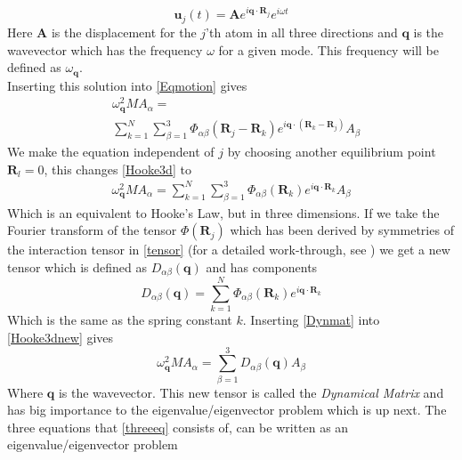 \begin{equation}
    \mathbf{u}_{j}(t)=\mathbf{A}e^{i\mathbf{q}\cdot\mathbf{R}_{j}}e^{i\omega t}
\end{equation}
Here $\mathbf{A}$ is the displacement for the $j$'th atom in all three directions and $\mathbf{q}$ is the wavevector which has the frequency $\omega$ for a given mode. This frequency will be defined as $\omega_{\mathbf{q}}$.\\ Inserting this solution into \cref{Eqmotion} gives
\begin{align}
&\omega_{\mathbf{q}}^{2}MA_{\alpha}=\nonumber\\
&\sum_{k=1}^{N}\sum_{\beta=1}^{3}\Phi_{\alpha\beta}(\mathbf{R}_{j}-\mathbf{R}_{k})e^{i\mathbf{q}\cdot(\mathbf{R}_{k}-\mathbf{R}_{j})}A_{\beta}\label{Hooke3d}
\end{align}
We make the equation independent of $j$ by choosing another equilibrium point $\mathbf{R}_{l}=0$, this changes \cref{Hooke3d} to
\begin{align}
\omega_{\mathbf{q}}^{2}MA_{\alpha}=\sum_{k=1}^{N}\sum_{\beta=1}^{3}\Phi_{\alpha\beta}(\mathbf{R}_{k})e^{i\mathbf{q}\cdot\mathbf{R}_{k}}A_{\beta}\label{Hooke3dnew}
\end{align}
Which is an equivalent to Hooke's Law, but in three dimensions. If we take the Fourier transform of the tensor $\Phi(\mathbf{R}_{j})$ which has been derived by symmetries of the interaction tensor in \cref{tensor} (for a detailed work-through, see ) we get a new tensor which is defined as $D_{\alpha\beta}(\mathbf{q})$ and has components
\begin{equation}
    D_{\alpha\beta}(\mathbf{q})=\sum_{k=1}^{N}\Phi_{\alpha\beta}(\mathbf{R}_{k})e^{i\mathbf{q}\cdot\mathbf{R}_{k}}\label{Dynmat}
\end{equation}
Which is the same as the spring constant $k$. Inserting \cref{Dynmat} into \cref{Hooke3dnew} gives
\begin{equation}
    \omega_{\mathbf{q}}^{2}MA_{\alpha}=\sum_{\beta=1}^{3}D_{\alpha\beta}(\mathbf{q})A_{\beta}\label{threeeq}
\end{equation}
Where $\mathbf{q}$ is the wavevector. This new tensor is called the \textit{Dynamical Matrix} and has big importance to the eigenvalue/eigenvector problem which is up next. The three equations that \cref{threeeq} consists of, can be written as an eigenvalue/eigenvector problem
